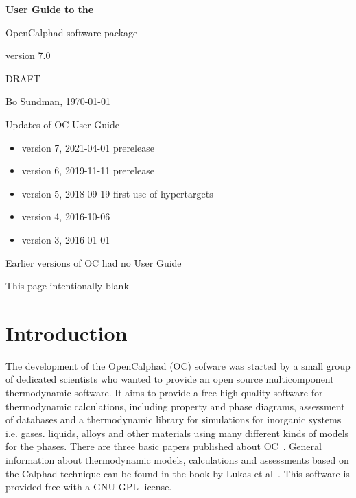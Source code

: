 \documentclass[11pt]{article}
\begin{document}
\begin{center}

{\Huge \bf User Guide to the 

OpenCalphad software package

version 7.0

}

\bigskip

{\Large DRAFT}

\bigskip

Bo Sundman, \today

\end{center}

\vspace{25mm}

Updates of OC User Guide
\begin{itemize}
\item version 7, 2021-04-01 prerelease
\item version 6, 2019-11-11 prerelease
\item version 5, 2018-09-19 first use of hypertargets
\item version 4, 2016-10-06
\item version 3, 2016-01-01
\end{itemize}

Earlier versions of OC had no User Guide

\newpage

This page intentionally blank

\newpage

\tableofcontents

\newpage

\section{Introduction}

The development of the OpenCalphad (OC) sofware was started by a small
group of dedicated scientists who wanted to provide an open source
multicomponent thermodynamic software.  It aims to provide a free high
quality software for thermodynamic calculations, including property
and phase diagrams, assessment of databases and a thermodynamic
library for simulations for inorganic systems i.e.  gases. liquids,
alloys and other materials using many different kinds of models for
the phases.  There are three basic papers published about
OC~\cite{15Sun1,15Sun2,16Sun}.  General information about
thermodynamic models, calculations and assessments based on the
Calphad technique can be found in the book by Lukas et
al~\cite{07Luk}.  This software is provided free with a GNU GPL
license.
\end{document}
